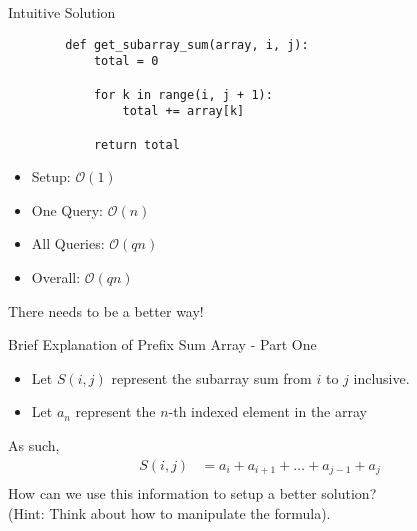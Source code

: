 \documentclass{beamer}
\begin{document}
\begin{frame}[fragile]{Intuitive Solution}
    \begin{lstlisting}
        def get_subarray_sum(array, i, j):
            total = 0
            
            for k in range(i, j + 1):
                total += array[k]
            
            return total
    \end{lstlisting}
    
    \begin{itemize}
        \item Setup: $\mathcal{O}(1)$
        \item One Query: $\mathcal{O}(n)$
        \item All Queries: $\mathcal{O}(qn)$
        \item Overall: $\mathcal{O}(qn)$
    \end{itemize}
    
    There needs to be a better way!
\end{frame}

\begin{frame}{Brief Explanation of Prefix Sum Array - Part One}
    \begin{itemize}
        \item Let $S(i, j)$ represent the subarray sum from $i$ to $j$ inclusive. \\
        \item Let $a_n$ represent the $n$-th indexed element in the array
    \end{itemize}
    
    As such, 
    \begin{align*}
        S(i, j) & = a_{i} + a_{i + 1} + \dots + a_{j - 1} + a_{j} \\
    \end{align*}
    How can we use this information to setup a better solution? \\
    
    (Hint: Think about how to manipulate the formula).
\end{frame}
\end{document}
